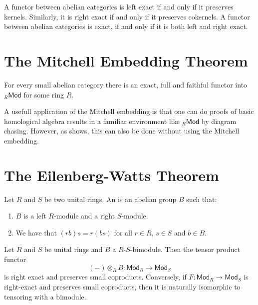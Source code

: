 \begin{remark}
	A functor between abelian categories is left exact if and only if it preserves kernels. Similarly, it is right exact if and only if it preserves cokernels. A functor between abelian categories is exact, if and only if it is both left and right exact.
\end{remark}

\section{The Mitchell Embedding Theorem}

\begin{theorem}
	For every small abelian category there is an exact, full and faithful functor into $_{R}\mathsf{Mod}$ for some ring $R$.
	\label{thm:mitchell_embedding}
\end{theorem}

A usefull application of the Mitchell embedding is that one can do proofs of basic homological algebra results in a familiar environment like $_{R}\mathsf{Mod}$ by diagram chasing. However, as \cite[202--208]{maclane:categories:1978} shows, this can also be done without using the Mitchell embedding.

\section{The Eilenberg-Watts Theorem}

\begin{definition}[Bimodule]
	Let $R$ and $S$ be two unital rings. An  is an abelian group $B$ such that:
	\begin{enumerate}[label = \textup{(}\alph*\textup{)},wide = 0pt]
		\item $B$ is a left $R$-module and a right $S$-module.
		\item We have that $(rb)s = r(bs)$ for all $r \in R$, $s \in S$ and $b \in B$.
	\end{enumerate}
\end{definition}

\begin{theorem}
	Let $R$ and $S$ be unital rings and $B$ a $R$-$S$-bimodule. Then the tensor product functor
	\begin{equation*}
		(-)\otimes_R B : \mathsf{Mod}_R \to \mathsf{Mod}_S
	\end{equation*}
	\noindent is right exact and preserves small coproducts. Conversely, if $F : \mathsf{Mod}_R \to \mathsf{Mod}_S$ is right-exact and preserves small coproducts, then it is naturally isomorphic to tensoring with a bimodule.
\end{theorem}

\printbibliography

